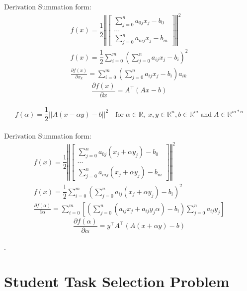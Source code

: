 \documentclass[12pt]{article}         %
\begin{document}
Derivation Summation form:
$$
\begin{aligned}
f(x) = \dfrac{1}{2}\left\Vert
  \begin{bmatrix}
 \sum_{j=0}^{n}a_{0j}x_j - b_0\\
...\\
  \sum_{j=0}^{n}a_{mj}x_j - b_m
   \end{bmatrix}
\right\Vert^2\\
f(x) = \dfrac{1}{2}\sum_{i=0}^{m}\left(\sum_{j=0}^{n}a_{ij}x_j - b_i\right)^2\\
\frac {\partial f(x)}{\partial x_k} = \sum_{i=0}^{m}(\sum_{j=0}^{n}a_{ij}x_j - b_i)a_{ik}
\end{aligned}
$$
$$
	\frac {\partial f(x)}{\partial x}  = A^\top(Ax - b)
$$\\
\pagebreak
\begin{equation}
	f(\alpha) = \dfrac{1}{2}||A(x - \alpha y) - b||^2 \quad\text{for}\; \alpha\in \mathbb{R},\; x,y\in\mathbb{R}^n ,b\in \mathbb{R}^m \;\text{and}\; A\in\mathbb{R}^{m*n}
\end{equation}\\

Derivation Summation form:
$$
\begin{aligned}
f(x) = \dfrac{1}{2}\left\Vert
  \begin{bmatrix}
 \sum_{j=0}^{n}a_{0j}(x_j + \alpha y_j) - b_0\\
...\\
  \sum_{j=0}^{n}a_{mj}(x_j + \alpha y_j) - b_m
   \end{bmatrix}
\right\Vert^2\\
f(x) = \dfrac{1}{2}\sum_{i=0}^{m}\left(\sum_{j=0}^{n}a_{ij}(x_j + \alpha y_j) - b_i\right)^2\\
\frac {\partial f(\alpha)}{\partial \alpha} = \sum_{i=0}^{m}\left[ \left( \sum_{j=0}^{n}(a_{ij}x_j +a_{ij}y_j\alpha) - b_i\right)\sum_{j=0}^{n}a_{ij}y_j\right]
\end{aligned}
$$
$$
	\frac {\partial f(\alpha)}{\partial \alpha} = y^\top A^\top(A(x +\alpha y) - b)
$$\\

	.


\section{Student Task Selection Problem}
\end{document}
